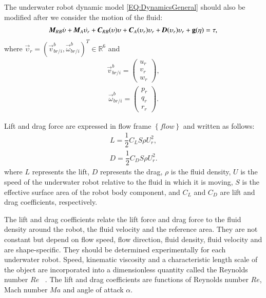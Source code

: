 The underwater robot dynamic model \ref{EQ:DynamicsGeneral} should also be modified after we consider the motion of the fluid:
\begin{align}
\emph{\textbf{M}}_{RB}\dot{\vec{\upsilon}}+\emph{\textbf{M}}_{A}\dot{\vec{\upsilon}_{r}}
+
\emph{\textbf{C}}_{RB}(\vec{\upsilon})\vec{\upsilon}
+\emph{\textbf{C}}_{A}(\vec{\upsilon}_{r})\vec{\upsilon}_{r}
+\emph{\textbf{D}}(\vec{\upsilon}_{r})\vec{\upsilon}_{r}
+\vec{g}(\vec{\eta})
=
\vec{\tau}\label{EQ:DynamicExtended},
\end{align}
where $\vec{\upsilon}_{r}=(\vec{v}^{b}_{br/i},\vec{\omega}^{b}_{br/i})^{T}\in \mathbb{R}^{6}$ and
\begin{align}
\vec{v}^{b}_{br/i}=\begin{pmatrix}
u_{r}\\v_{r}\\w_{r}
\end{pmatrix},
\end{align}
\begin{align}
\vec{\omega}^{b}_{br/i}=\begin{pmatrix}
p_{r}\\q_{r}\\r_{r}
\end{pmatrix}.
\end{align}

Lift and drag force are expressed in flow frame $\left\{ flow \right\}$ and written as follows:
\begin{align}
L=\dfrac{1}{2}C_{L}S \rho U_{r}^{2},
\end{align}
\begin{align}
D=\dfrac{1}{2}C_{D}S \rho U_{r}^{2}.
\end{align}
where $L$ represents the lift, $D$ represents the drag, $\rho$ is the fluid density, $U$ is the speed of the underwater robot relative to the fluid in which it is moving, $S$ is the effective surface area of the robot body component, and $C_{L}$ and $C_{D}$ are lift and drag coefficients, respectively.

The lift and drag coefficients relate the lift force and drag force to the fluid density around the robot, the fluid velocity and the reference area. They are not constant but depend on flow speed, flow direction, fluid density, fluid velocity and are shape-specific. They should be determined experimentally for each underwater robot. Speed, kinematic viscosity and a characteristic length scale of the object are incorporated into a dimensionless quantity called the Reynolds number $Re$~
\cite{wikiDragCoefficient}. The lift and drag coefficients are functions of Reynolds number $Re$, Mach number $Ma$ and angle of attack $\alpha$. 

